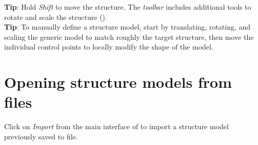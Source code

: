 \textbf{Tip}: Hold \textit{Shift} to move the structure. The \textit{\ij toolbar} includes additional tools to rotate and scale the structure ().\\

\textbf{Tip}: To manually define a structure model, start by translating, rotating, and scaling the generic model to match roughly the target structure, then move the individual control points to locally modify the shape of the model.

\section{Opening structure models from files}\label{sec:structure_import}
Click on \textit{Import} from the main interface of \wingj to import a structure model previously saved to file.



